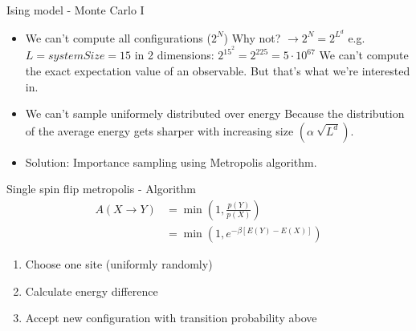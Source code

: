 \documentclass[handout]{beamer}
\begin{document}
\begin{frame}{Ising model - Monte Carlo I}
\begin{itemize}
\item<2-> We can't compute all configurations (\(2^N\))
	 {Why not? \( \rightarrow 2^N = 2^{L^d} \) e.g. \( L = systemSize = 15 \) in 2 dimensions: \(2^{15^2} = 2^{225} = 5 \cdot 10^{67}\)}
	 {We can't compute the exact expectation value of an observable. But that's what we're interested in.}
\item<3-> We can't sample uniformely distributed over energy \def\svgwidth{12em} 
	 {Because the distribution of the average energy gets sharper with increasing size \(\left(\alpha \ \sqrt{L^d}\right)\).}
\item<4-> Solution: Importance sampling using Metropolis algorithm.
\end{itemize}
\end{frame}

\begin{frame}{Single spin flip metropolis - Algorithm}
\pause
\begin{align*}
A(X \rightarrow Y) &= \min \left( 1, \frac{p(Y)}{p(X)} \right) \\ 
&= \min \left( 1, e^{- \beta \left[ E(Y)-E(X) \right] } \right)
\end{align*}
\begin{enumerate}
\item Choose one site (uniformly randomly)
\item Calculate energy difference
\item Accept new configuration with transition probability above
\end{enumerate}
\end{frame}
\end{document}
